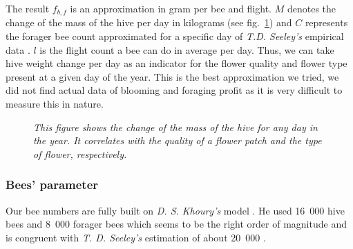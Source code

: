 			The result $f_{b,f}$ is an approximation in gram per bee and flight. $M$ denotes the change of the mass of the hive per day in kilograms (see fig.~\ref{fig:seasonalFlowers}) and $C$ represents the forager bee count approximated for a specific day of \textit{T.D. Seeley's} empirical data \cite{seeley95}. $l$ is the flight count a bee can do in average per day. Thus, we can take hive weight change per day as an indicator for the flower quality and flower type present at a given day of the year. This is the best approximation we tried, we did not find actual data of blooming and foraging profit as it is very difficult to measure this in nature.
			
			\begin{figure}[H]
				\centering
				\caption{\textit{This figure shows the change of the mass of the hive for any day in the year. It correlates with the quality of a flower patch and the type of flower, respectively.}}
				\label{fig:seasonalFlowers}
			\end{figure}
			
		\subsubsection{Bees' parameter}
			\label{chap:beesParameters}
			Our bee numbers are fully built on \textit{D. S. Khoury's} model \cite{khoury13}. He used 16~000 hive bees and 8~000 forager bees which seems to be the right order of magnitude and is congruent with \textit{T. D. Seeley's} estimation of about 20~000 \cite{seeley95}. 
			
